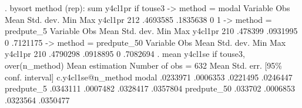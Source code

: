 . bysort method (rep): sum y4cl1pr if touse3
{\smallskip}
-> method = modal
{\smallskip}
    Variable {\VBAR}        Obs        Mean    Std. dev.       Min        Max
     y4cl1pr {\VBAR}        212    .4693585    .1835638          0          1
{\smallskip}
-> method = predpute_5
{\smallskip}
    Variable {\VBAR}        Obs        Mean    Std. dev.       Min        Max
     y4cl1pr {\VBAR}        210     .478399    .0931995          0   .7121175
{\smallskip}
-> method = predpute_50
{\smallskip}
    Variable {\VBAR}        Obs        Mean    Std. dev.       Min        Max
     y4cl1pr {\VBAR}        210    .4790298    .0918895          0   .7082694
{\smallskip}
{\smallskip}
. mean y4cl1se if touse3, over(n_method)
{\smallskip}
Mean estimation                                  Number of obs = 632
{\smallskip}
                   {\VBAR}       Mean   Std. err.     [95\% conf. interval]
c.y4cl1se@n_method {\VBAR}
            modal  {\VBAR}   .0233971   .0006353      .0221495    .0246447
       predpute_5  {\VBAR}   .0343111   .0007482      .0328417    .0357804
      predpute_50  {\VBAR}    .033702   .0006853      .0323564    .0350477
